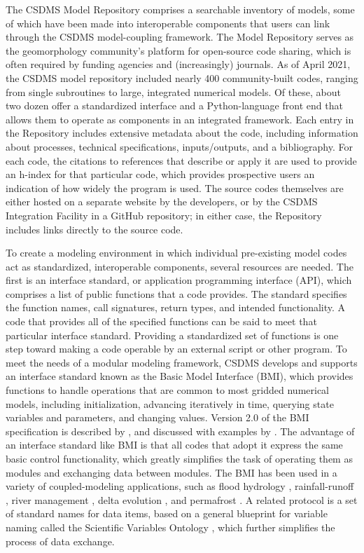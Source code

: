 \documentclass[10pt,twocolumn,preprint]{elsarticle}
\begin{document}
The CSDMS Model Repository comprises a searchable inventory of models, some of which have been made into interoperable components that users can link through the CSDMS model-coupling framework. The Model Repository serves as the geomorphology community's platform for open-source code sharing, which is often required by funding agencies and (increasingly) journals. As of April 2021, the CSDMS model repository included nearly 400 community-built codes, ranging from single subroutines to large, integrated numerical models. Of these, about two dozen offer a standardized interface and a Python-language front end that allows them to operate as components in an integrated framework. Each entry in the Repository includes extensive metadata about the code, including information about processes, technical specifications, inputs/outputs, and a bibliography. For each code, the citations to references that describe or apply it are used to provide an h-index for that particular code, which provides prospective users an indication of how widely the program is used. The source codes themselves are either hosted on a separate website by the developers, or by the CSDMS Integration Facility in a GitHub repository; in either case, the Repository includes links directly to the source code.

To create a modeling environment in which individual pre-existing model codes act as standardized, interoperable components, several resources are needed. The first is an interface standard, or application programming interface (API), which comprises a list of public functions that a code provides. The standard specifies the function names, call signatures, return types, and intended functionality. A code that provides all of the specified functions can be said to meet that particular interface standard. Providing a standardized set of functions is one step toward making a code operable by an external script or other program. To meet the needs of a modular modeling framework, CSDMS develops and supports an interface standard known as the Basic Model Interface (BMI), which provides functions to handle operations that are common to most gridded numerical models, including initialization, advancing iteratively in time, querying state variables and parameters, and changing values. Version 2.0 of the BMI specification is described by \citet{hutton2020basic}, and discussed with examples by \citet{tucker2021numerical}. The advantage of an interface standard like BMI is that all codes that adopt it express the same basic control functionality, which greatly simplifies the task of operating them as modules and exchanging data between modules. The BMI has been used in a variety of coupled-modeling applications, such as flood hydrology \citep{hoch2019advancing,hoch2019evaluating}, rainfall-runoff \citep{piper2020coupling}, river management \citep{den2020virtual}, delta evolution \citep{ratliff2018exploring,ratliff2021modeling}, and permafrost \citep{wang2020sensitivity}. A related protocol is a set of standard names for data items, based on a general blueprint for variable naming called the Scientific Variables Ontology \citep{stoica2018ontology,stoica2019incorporating,stoica2019scientific,stoica2020github}, which further simplifies the process of data exchange.
\end{document}
